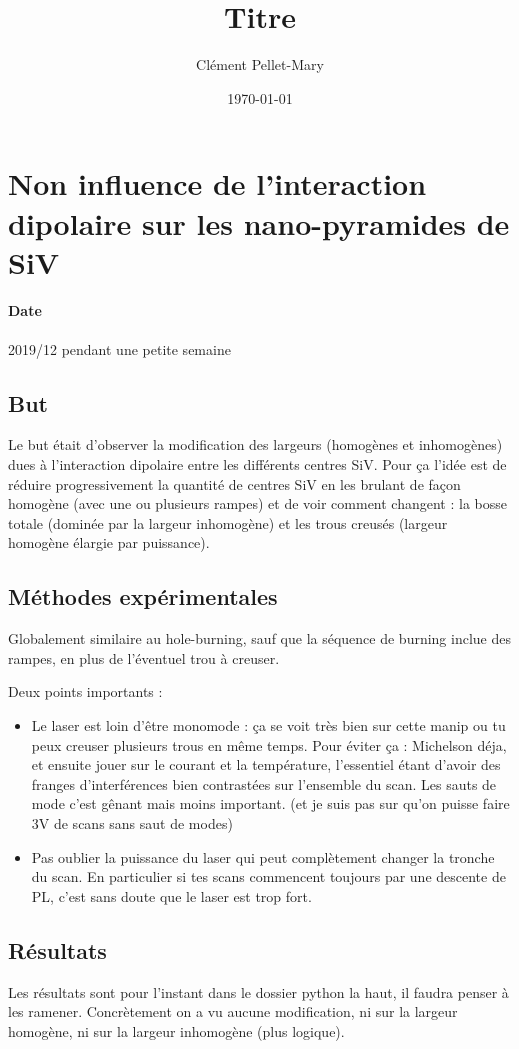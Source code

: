 \documentclass[a4paper]{report}
\title{Titre}
\author{Clément Pellet-Mary}
\date\today
\begin{document}
\chapter{Non influence de l'interaction dipolaire sur les nano-pyramides de SiV}
\subsubsection{Date}
2019/12 pendant une petite semaine
  \section{But}
  Le but était d'observer la modification des largeurs (homogènes et inhomogènes) dues à l'interaction dipolaire entre les différents centres SiV. Pour ça l'idée est de réduire progressivement la quantité de centres SiV en les brulant de façon homogène (avec une ou plusieurs rampes) et de voir comment changent : la bosse totale (dominée par la largeur inhomogène) et les trous creusés (largeur homogène élargie par puissance).
  \section{Méthodes expérimentales}
  Globalement similaire au hole-burning, sauf que la séquence de burning inclue des rampes, en plus de l'éventuel trou à creuser.
  
  Deux points importants : 
  \begin{itemize}
  \item Le laser est loin d'être monomode : ça se voit très bien sur cette manip ou tu peux creuser plusieurs trous en même temps. Pour éviter ça : Michelson déja, et ensuite jouer sur le courant et la température, l'essentiel étant d'avoir des franges d'interférences bien contrastées sur l'ensemble du scan. Les sauts de mode c'est gênant mais moins important. (et je suis pas sur qu'on puisse faire 3V de scans sans saut de modes)
  \item Pas oublier la puissance du laser qui peut complètement changer la tronche du scan. En particulier si tes scans commencent toujours par une descente de PL, c'est sans doute que le laser est trop fort.
  \end{itemize}
  \section{Résultats}
 Les résultats sont pour l'instant dans le dossier python la haut, il faudra penser à les ramener.
 Concrètement on a vu aucune modification, ni sur la largeur homogène, ni sur la largeur inhomogène (plus logique).
  
\end{document}
